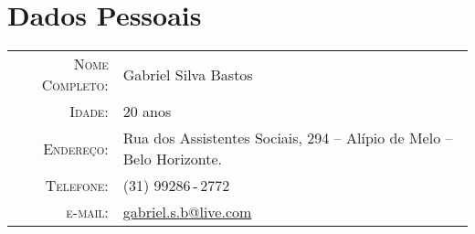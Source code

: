 \documentclass[a4paper,10pt]{article}
\renewcommand\#{\protect\scalebox{0.8}{\protect\raisebox{0.4ex}{\char"0023}}}
\begin{document}
\pagestyle{empty} %

\par{
  \bigskip
  \par
}

\section{Dados Pessoais}

\begin{tabular}{rl}
  \textsc{Nome Completo:} & Gabriel Silva Bastos \\
  \textsc{Idade:}         & 20 anos \\
  \textsc{Endereço:}      & Rua dos Assistentes Sociais, 294 -- Alípio de Melo -- Belo Horizonte. \\
  \textsc{Telefone:}      & (31) 99286\,-\,2772 \\
  \textsc{e-mail:}         & \href{mailto:gabriel.s.b@live.com}{gabriel.s.b@live.com}
\end{tabular}
\end{document}
